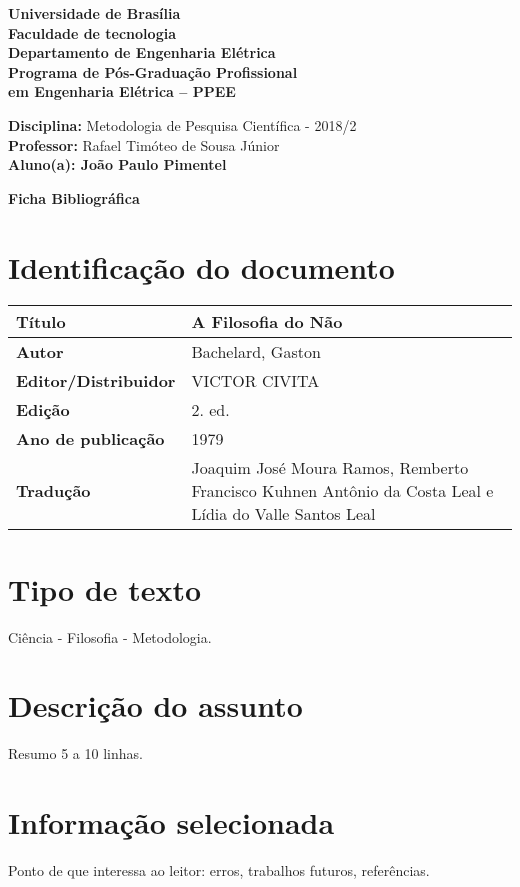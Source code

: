 \documentclass[11pt]{article}
\begin{document}
\noindent
\begin{center}
\Large\textbf{Universidade de Brasília}\\
\Large\textbf{Faculdade de tecnologia}\\
\Large\textbf{Departamento de Engenharia Elétrica}\\
\Large\textbf{Programa de Pós-Graduação Profissional \\
	em Engenharia Elétrica -- PPEE}\\
\end{center}

\large{
\noindent
\textbf{Disciplina:} Metodologia de Pesquisa Científica - 2018/2\\
\textbf{Professor:} Rafael Timóteo de Sousa Júnior \\
\textbf{Aluno(a): João Paulo Pimentel}}\\

\begin{center}
\Large\textbf{Ficha Bibliográfica}
\end{center}
\normalsize

\section{Identificação do documento}
\begin{center}
	\begin{tabular}{|l|l|} \hline
		\textbf{Título} & A Filosofia do Não\cite{Bachelard1979} \\ \hline
		\textbf{Autor} & Bachelard, Gaston \\ \hline
		\textbf{Editor/Distribuidor} & VICTOR CIVITA
 \\ \hline
		\textbf{Edição} & 2. ed. \\ \hline
		\textbf{Ano de publicação} & 1979 \\ \hline
		\textbf{Tradução} &  Joaquim José Moura Ramos, Remberto Francisco Kuhnen Antônio da Costa Leal e Lídia do Valle Santos Leal \\ \hline
	\end{tabular}
\end{center}

\section{Tipo de texto}
Ciência - Filosofia - Metodologia.

\section{Descrição do assunto}
Resumo 5 a 10 linhas.

\section{Informação selecionada}
Ponto de que interessa ao leitor: erros, trabalhos futuros, referências.



\end{document}
